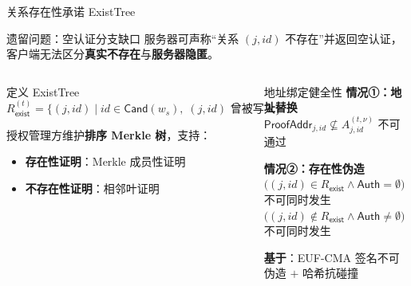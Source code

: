 \begin{frame}{关系存在性承诺 ExistTree}

  \begin{alertblock}{遗留问题：空认证分支缺口}
    服务器可声称``关系 $(j, \mathit{id})$ 不存在''并返回空认证，
    客户端无法区分\textbf{真实不存在}与\textbf{服务器隐匿}。
  \end{alertblock}

  \vspace{0.4em}

  \begin{columns}[T]
      \begin{block}{定义 ExistTree}
        \small
        $R_\mathsf{exist}^{(t)} = \{ (j,\mathit{id}) \mid \mathit{id} \in \mathsf{Cand}(w_s),\;
          (j,\mathit{id}) \text{ 曾被写入} \}$

        \medskip
        授权管理方维护\textbf{排序 Merkle 树}，支持：
        \begin{itemize}
          \item \textbf{存在性证明}：Merkle 成员性证明
          \item \textbf{不存在性证明}：相邻叶证明
        \end{itemize}
      \end{block}

      \begin{exampleblock}{地址绑定健全性}
        \small
        \textbf{情况①：地址替换}\\
        $\mathsf{ProofAddr}_{j,\mathit{id}} \not\subseteq A_{j,\mathit{id}}^{(t,\nu)}$ 不可通过

        \medskip
        \textbf{情况②：存在性伪造}\\
        $\bigl((j,\mathit{id}) \in R_\mathsf{exist} \wedge \mathsf{Auth} = \emptyset\bigr)$
        不可同时发生\\
        $\bigl((j,\mathit{id}) \notin R_\mathsf{exist} \wedge \mathsf{Auth} \neq \emptyset\bigr)$
        不可同时发生

        \medskip
        \textbf{基于}：EUF-CMA 签名不可伪造 $+$ 哈希抗碰撞
      \end{exampleblock}
  \end{columns}

\end{frame}
